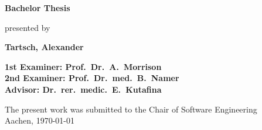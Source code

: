 \begin{titlepage}
\begin{flushleft}
{    {\Large \textbf{Bachelor Thesis}\\}
		\vspace{3em} 
		
		{\large presented by\\} 
    
    {\LARGE \textbf{Tartsch, Alexander}\\}
    \vspace{3em} 
		    
    {\Large \textbf{1st Examiner: Prof.\ Dr.\ A.\ Morrison}\\}
    \vspace{1em} 
    {\Large \textbf{2nd Examiner: Prof.\ Dr.\ med.\ B.\ Namer}\\}
    \vspace{1em} 
    {\Large \textbf{Advisor: Dr.\ rer.\ medic.\ E.\ Kutafina}\\}
    \vspace{7em} 

    {\large The present work was submitted to the Chair of Software Engineering \\}
    \vspace{1em}
		{\large	Aachen, \today\\}
  }
\end{flushleft}

\end{titlepage}






